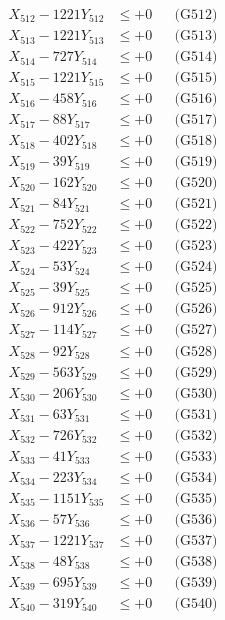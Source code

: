 \documentclass[a4paper,10pt]{article}
\begin{document}
{\begin{align}
X_{512} - 1221Y_{512} &\leq +0 && \text{(G512)} \\
X_{513} - 1221Y_{513} &\leq +0 && \text{(G513)} \\
X_{514} - 727Y_{514} &\leq +0 && \text{(G514)} \\
X_{515} - 1221Y_{515} &\leq +0 && \text{(G515)} \\
X_{516} - 458Y_{516} &\leq +0 && \text{(G516)} \\
X_{517} - 88Y_{517} &\leq +0 && \text{(G517)} \\
X_{518} - 402Y_{518} &\leq +0 && \text{(G518)} \\
X_{519} - 39Y_{519} &\leq +0 && \text{(G519)} \\
X_{520} - 162Y_{520} &\leq +0 && \text{(G520)} \\
\allowbreak
X_{521} - 84Y_{521} &\leq +0 && \text{(G521)} \\
X_{522} - 752Y_{522} &\leq +0 && \text{(G522)} \\
X_{523} - 422Y_{523} &\leq +0 && \text{(G523)} \\
X_{524} - 53Y_{524} &\leq +0 && \text{(G524)} \\
X_{525} - 39Y_{525} &\leq +0 && \text{(G525)} \\
X_{526} - 912Y_{526} &\leq +0 && \text{(G526)} \\
X_{527} - 114Y_{527} &\leq +0 && \text{(G527)} \\
X_{528} - 92Y_{528} &\leq +0 && \text{(G528)} \\
X_{529} - 563Y_{529} &\leq +0 && \text{(G529)} \\
X_{530} - 206Y_{530} &\leq +0 && \text{(G530)} \\
\allowbreak
X_{531} - 63Y_{531} &\leq +0 && \text{(G531)} \\
X_{532} - 726Y_{532} &\leq +0 && \text{(G532)} \\
X_{533} - 41Y_{533} &\leq +0 && \text{(G533)} \\
X_{534} - 223Y_{534} &\leq +0 && \text{(G534)} \\
X_{535} - 1151Y_{535} &\leq +0 && \text{(G535)} \\
X_{536} - 57Y_{536} &\leq +0 && \text{(G536)} \\
X_{537} - 1221Y_{537} &\leq +0 && \text{(G537)} \\
X_{538} - 48Y_{538} &\leq +0 && \text{(G538)} \\
X_{539} - 695Y_{539} &\leq +0 && \text{(G539)} \\
X_{540} - 319Y_{540} &\leq +0 && \text{(G540)} \\

\end{align}}
\end{document}
